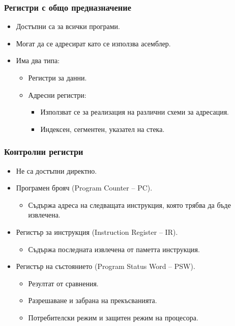 \documentclass[ignorenonframetext, hyperref=unicode]{beamer}
\begin{document}
\begin{frame}
\frametitle{Регистри с общо предназначение}
\begin{itemize}
\item Достъпни са за всички програми.
\item Могат да се адресират като се използва асемблер.
\item Има два типа:
\begin{itemize}
  \item Регистри за данни.
  \item Адресни регистри:
  \begin{itemize}
    \item Използват се за реализация на различни схеми за адресация.
    \item Индексен, сегментен, указател на стека.
  \end{itemize}
\end{itemize}
\end{itemize}
\end{frame}


\begin{frame}
\frametitle{Контролни регистри}
\begin{itemize}
\item Не са достъпни директно.
\item Програмен брояч (Program Counter -- PC).
\begin{itemize}
  \item Съдържа адреса на следващата инструкция, която трябва да бъде извлечена.
\end{itemize}
\item Регистър за инструкция (Instruction Register -- IR).
\begin{itemize}
  \item Съдържа последната извлечена от паметта инструкция.
\end{itemize}
\item Регистър на състоянието (Program Status Word -- PSW).
\begin{itemize}
  \item Резултат от сравнения.
  \item Разрешаване и забрана на прекъсванията.
  \item Потребителски режим и защитен режим на процесора.
\end{itemize}
\end{itemize}
\end{frame}
\end{document}
